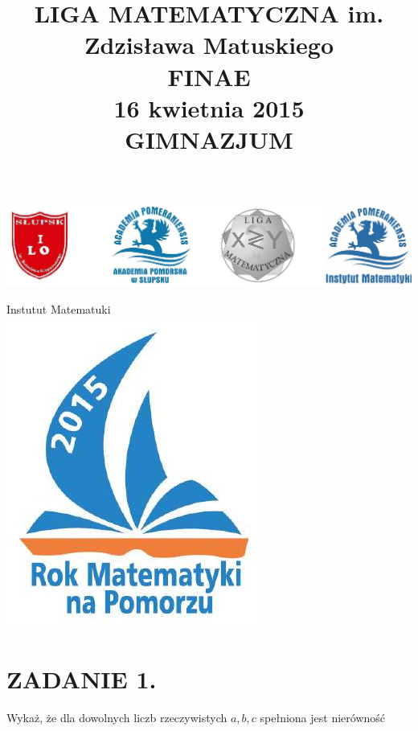 \documentclass[10pt]{article}
\title{LIGA MATEMATYCZNA im. Zdzisława Matuskiego \\
 FINAE \\
 16 kwietnia 2015 \\
 GIMNAZJUM }
\author{}
\date{}
\begin{document}
\maketitle
\begin{center}
\includegraphics[max width=\textwidth]{2024_11_21_78ffcac4c64f7618ee88g-1(1)}
\end{center}

Instutut Matematuki\\
\includegraphics[max width=\textwidth, center]{2024_11_21_78ffcac4c64f7618ee88g-1}

\section*{ZADANIE 1.}
Wykaż, że dla dowolnych liczb rzeczywistych \(a, b, c\) spełniona jest nierówność
\end{document}
